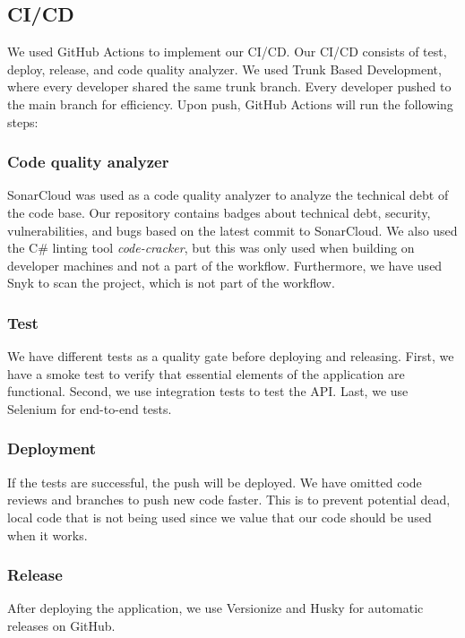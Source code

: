 \subsection{CI/CD}
We used GitHub Actions to implement our CI/CD. Our CI/CD consists of test, deploy, release, and code quality analyzer. We used Trunk Based Development, where every developer shared the same trunk branch. Every developer pushed to the main branch for efficiency. Upon push, GitHub Actions will run the following steps:

\subsubsection{Code quality analyzer}
SonarCloud was used as a code quality analyzer to analyze the technical debt of the code base. Our repository contains badges about technical debt, security, vulnerabilities, and bugs based on the latest commit to SonarCloud. We also used the C\# linting tool \textit{code-cracker}, but this was only used when building on developer machines and not a part of the workflow. Furthermore, we have used Snyk to scan the project, which is not part of the workflow.

\subsubsection{Test}
We have different tests as a quality gate before deploying and releasing. First, we have a smoke test to verify that essential elements of the application are functional. Second, we use integration tests to test the API. Last, we use Selenium for end-to-end tests.

\subsubsection{Deployment}
If the tests are successful, the push will be deployed. We have omitted code reviews and branches to push new code faster. This is to prevent potential dead, local code that is not being used since we value that our code should be used when it works.

\subsubsection{Release}
After deploying the application, we use Versionize and Husky for automatic releases on GitHub.

